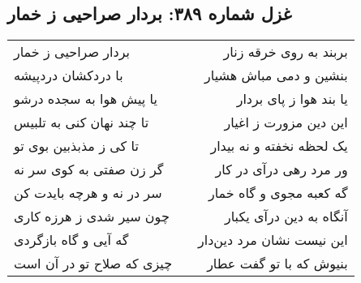 \begin{center}
\section*{غزل شماره ۳۸۹: بردار صراحیی ز خمار}
\label{sec:389}
\begin{longtable}{l p{0.5cm} r}
بردار صراحیی ز خمار
&&
بربند به روی خرقه زنار
\\
با دردکشان دردپیشه
&&
بنشین و دمی مباش هشیار
\\
یا پیش هوا به سجده درشو
&&
یا بند هوا ز پای بردار
\\
تا چند نهان کنی به تلبیس
&&
این دین مزورت ز اغیار
\\
تا کی ز مذبذبین بوی تو
&&
یک لحظه نخفته و نه بیدار
\\
گر زن صفتی به کوی سر نه
&&
ور مرد رهی درآی در کار
\\
سر در نه و هرچه بایدت کن
&&
گه کعبه مجوی و گاه خمار
\\
چون سیر شدی ز هرزه کاری
&&
آنگاه به دین درآی یکبار
\\
گه آیی و گاه بازگردی
&&
این نیست نشان مرد دین‌دار
\\
چیزی که صلاح تو در آن است
&&
بنیوش که با تو گفت عطار
\\
\end{longtable}
\end{center}
